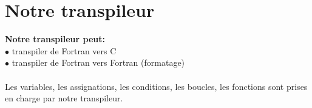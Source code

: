 \section{Notre transpileur}

\begin{frame}
    \textbf{Notre transpileur peut:}\\
    $\bullet$ transpiler de Fortran vers C\\
    $\bullet$ transpiler de Fortran vers Fortran (formatage)\\
    \vspace{0.5cm} {
        \\
        Les variables, les assignations, les conditions, les boucles, les fonctions sont prises en charge par notre transpileur. 
    }   

\end{frame}


\begin{frame}[fragile]
\scriptsize
\noindent
\begin{minipage}[t]{0.48\textwidth}

    
\end{minipage}
\hfill
\begin{minipage}[t]{0.48\textwidth}
\end{minipage}

\end{frame}

